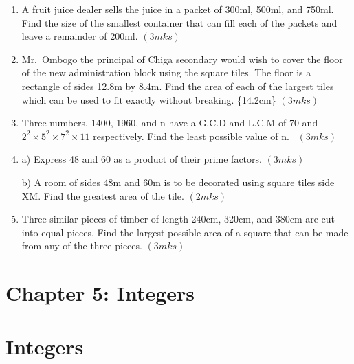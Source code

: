 \documentclass[
  letterpaper,
  DIV=11,
  numbers=noendperiod]{scrreprt}
\begin{document}
\begin{tcolorbox}
\begin{enumerate}
\item
  A fruit juice dealer sells the juice in a packet of 300ml, 500ml, and
  750ml. Find the size of the smallest container that can fill each of
  the packets and leave a remainder of 200ml.\hspace{0.6cm} \((3mks)\)
\item
  Mr.~Ombogo the principal of Chiga secondary would wish to cover the
  floor of the new administration block using the square tiles. The
  floor is a rectangle of sides 12.8m by 8.4m. Find the area of each of
  the largest tiles which can be used to fit exactly without breaking.
  \hspace*\{14.2cm\} \((3mks)\)
\item
  Three numbers, 1400, 1960, and n have a G.C.D and L.C.M of 70 and
  \(2^2\times 5^2\times 7^2 \times 11\) respectively. Find the least
  possible value of n.~\hspace{8.8cm} \((3mks)\)
\item
  a) Express 48 and 60 as a product of their prime factors.
  \hspace{11cm} \((3mks)\)

  b) A room of sides 48m and 60m is to be decorated using square tiles
  side XM. Find the greatest area of the tile. \hspace{9.2cm} \((2mks)\)
\item
  Three similar pieces of timber of length 240cm, 320cm, and 380cm are
  cut into equal pieces. Find the largest possible area of a square that
  can be made from any of the three pieces. \hspace{14.2cm} \((3mks)\)
\end{enumerate}

\end{tcolorbox}


\hypertarget{chapter-5-integers}{%
\chapter{Chapter 5: Integers}\label{chapter-5-integers}}


\hypertarget{integers}{%
\chapter*{Integers}\label{integers}}

\end{document}
